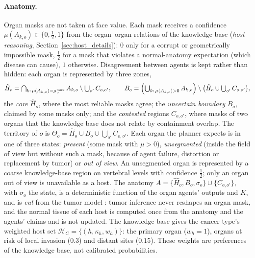 \documentclass[fleqn,10pt]{olplainarticle}
\begin{document}
\paragraph{Anatomy.}
Organ masks are not taken at face value. Each mask receives a confidence $\mu(A_{k,o})\in\{0,\tfrac12,1\}$ from the
organ--organ relations of the knowledge base (\emph{host reasoning}, Section~\ref{sec:host_details}): $0$ only for a corrupt or geometrically
impossible mask, $\tfrac12$ for a mask that violates a normal-anatomy expectation (which disease can cause), $1$
otherwise. Disagreement between agents is kept rather than hidden: each organ is represented by three zones,
\begin{equation}
\label{eq:organ_reference}
\hat H_o=\textstyle\bigcap_{k:\,\mu(A_{k,o})=\mu^{\max}_o}A_{k,o}\setminus\bigcup_{o'}C_{o,o'},\qquad
B_o=\Bigl(\textstyle\bigcup_{k:\,\mu(A_{k,o})>0}A_{k,o}\Bigr)\setminus\bigl(\hat H_o\cup\textstyle\bigcup_{o'}C_{o,o'}\bigr),
\end{equation}
the \emph{core} $\hat H_o$, where the most reliable masks agree; the \emph{uncertain boundary} $B_o$, claimed by some
masks only; and the \emph{contested} regions $C_{o,o'}$, where masks of two organs that the knowledge base does not relate
by containment overlap. The territory of $o$ is $\Theta_o=\hat H_o\cup B_o\cup\bigcup_{o'}C_{o,o'}$. Each organ the
planner expects is in one of three states: \emph{present} (some mask with $\mu>0$), \emph{unsegmented} (inside the field
of view but without such a mask, because of agent failure, distortion or replacement by tumor) or \emph{out of view}. An
unsegmented organ is represented by a coarse knowledge-base region on vertebral levels with confidence $\tfrac12$; only an
organ out of view is unavailable as a host. The anatomy $A=\{\hat H_o,B_o,\sigma_o\}\cup\{C_{o,o'}\}$, with $\sigma_o$ the
state, is a deterministic function of the organ agents' outputs and $K$, and is \emph{cut} from the tumor model
\cite{liu2009modularization,plummer2015cuts,jacob2017better}: tumor inference never reshapes an organ mask, and the normal
tissue of each host is computed once from the anatomy and the agents' claims and is not updated. The knowledge base
gives the cancer type's weighted host set $\mathcal{H}_C=\{(h,\kappa_h,w_h)\}$: the primary organ ($w_h=1$), organs at
risk of local invasion ($0.3$) and distant sites ($0.15$). These weights are preferences of the knowledge base, not
calibrated probabilities.
\end{document}
